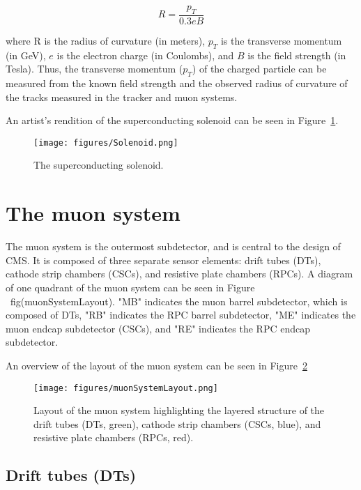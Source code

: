 \begin{equation}

R = \frac{p_{T}}{0.3eB}

\end{equation}

where R is the radius of curvature (in meters), $p_{T}$ is the transverse momentum (in GeV), $e$ is the electron charge (in Coulombs), and $B$ is the field strength (in Tesla). Thus, the transverse momentum ($p_{T}$) of the charged particle can be measured from the known field strength and the observed radius of curvature of the tracks measured in the tracker and muon systems.

An artist's rendition of the superconducting solenoid can be seen in Figure~\ref{fig:Solenoid}.

\begin{figure}\centering
  \texttt{[image: figures/Solenoid.png]}
  \caption{\label{fig:Solenoid} The superconducting solenoid.}
\end{figure}

\section{The muon system}

The muon system is the outermost subdetector, and is central to the design of CMS. It is composed of three separate sensor elements: drift tubes (DTs), cathode strip chambers (CSCs), and resistive plate chambers (RPCs). A diagram of one quadrant of the muon system can be seen in Figure ~fig(muonSystemLayout). "MB" indicates the muon barrel subdetector, which is composed of DTs, "RB" indicates the RPC barrel subdetector, "ME" indicates the muon endcap subdetector (CSCs), and "RE" indicates the RPC endcap subdetector. 

An overview of the layout of the muon system can be seen in Figure~\ref{fig:muonSystemLayout}

\begin{figure}\centering
  \texttt{[image: figures/muonSystemLayout.png]}
  \caption{\label{fig:muonSystemLayout} Layout of the muon system highlighting the layered structure of the drift tubes (DTs, green), cathode strip chambers (CSCs, blue), and resistive plate chambers (RPCs, red).}
\end{figure}

\subsection{Drift tubes (DTs)}

